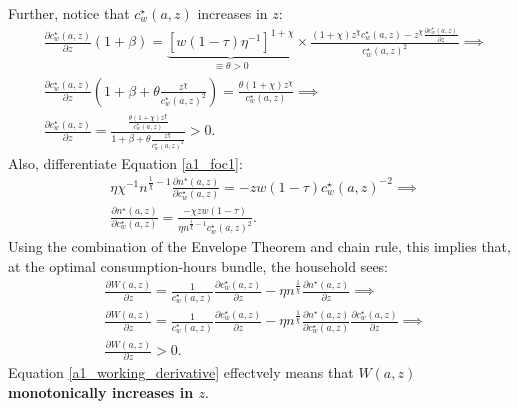  Further, notice that $c_w^\star (a,z)$ increases in $z$:
 \begin{subequations}
    \begin{align}
        & \frac{\partial c_w^\star (a,z)}{\partial z} (1+\beta)=\underbrace{\left[w (1-\tau) \eta^{-1} \right]^{1+\chi}}_{\equiv \theta >0 }\times  \frac{(1+\chi)z^\chi c_w^\star (a,z) - z^\chi \frac{\partial c_w^\star (a,z)}{\partial z} }{c_w^\star (a,z)^2} \implies \\
        & \frac{\partial c_w^\star (a,z)}{\partial z} \left(1+\beta +\theta \frac{z^\chi}{c_w^\star (a,z)^2}\right)= \frac{\theta  (1+\chi) z^\chi }{c_w^\star (a,z)} \implies \\
        & \frac{\partial c_w^\star (a,z)}{\partial z} = \frac{\frac{\theta  (1+\chi) z^\chi }{c_w^\star (a,z)} }{1+\beta +\theta \frac{z^\chi}{c_w^\star (a,z)^2}} >0. 
    \end{align}
 \end{subequations}
Also, differentiate Equation \eqref{a1_foc1}:
\begin{subequations}
    \begin{align}
        & \eta \chi^{-1} n^{\frac{1}{\chi}-1} \frac{\partial n^\star (a,z)}{\partial c_w^\star (a,z)}=-zw(1-\tau) c_w^\star (a,z)^{-2} \implies \\
        & \frac{\partial n^\star (a,z)}{\partial c_w^\star (a,z)}=\frac{-\chi zw(1-\tau)}{\eta n^{\frac{1}{\chi}-1}c_w^\star (a,z)^{2}}.
    \end{align}
\end{subequations}
Using the combination of the Envelope Theorem and chain rule, this implies that, at the optimal consumption-hours bundle, the household sees:
\begin{subequations}
    \begin{align}
        & \frac{\partial W(a,z)}{\partial z}= \frac{1}{c_w^\star (a,z)} \frac{\partial c_w^\star (a,z)}{\partial z} -\eta n^{\frac{1}{\chi}}\frac{\partial n^\star (a,z)}{\partial z} \implies \\
        & \frac{\partial W(a,z)}{\partial z}= \frac{1}{c_w^\star (a,z)} \frac{\partial c_w^\star (a,z)}{\partial z} -\eta n^{\frac{1}{\chi}}\frac{\partial n^\star (a,z)}{\partial c_w^\star (a,z)} \frac{\partial c_w^\star (a,z)}{\partial z} \implies \\
        & \boxed{\frac{\partial W(a,z)}{\partial z} >0.} \label{a1_working_derivative}
    \end{align}
\end{subequations}
Equation \eqref{a1_working_derivative} effectvely means that \textcolor{BurntOrange}{\textbf{$W(a,z)$ monotonically increases in $z$}}. \\


